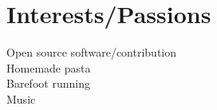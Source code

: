 \documentclass[letterpaper]{deedy-resume}
\begin{document}
\begin{minipage}[t]{0.3\textwidth}
\vspace{2em}
\section{Interests/Passions}
\vspace{1em}
\textbullet{} Open source software/contribution\\
\textbullet{} Homemade pasta\\
\textbullet{} Barefoot running\\
\textbullet{} Music\\

\end{minipage} %
\hfill
\vrule
\hspace{3ex}
%
%
\end{document}
